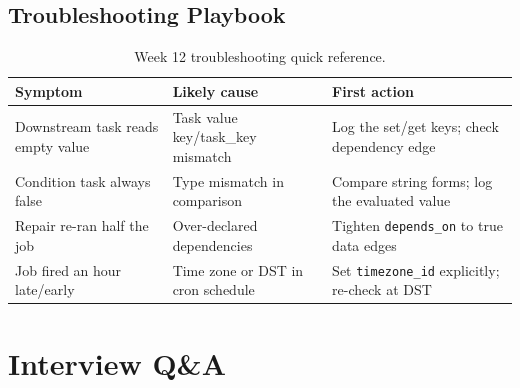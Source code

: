\subsection{Troubleshooting Playbook}
\begin{table}[H]
\centering
\small
\begin{tabular}{@{}p{3.6cm}p{4.2cm}p{4.8cm}@{}}
\toprule
\textbf{Symptom} & \textbf{Likely cause} & \textbf{First action} \\
\midrule
Downstream task reads empty value & Task value key/task\_key mismatch & Log the set/get keys; check dependency edge \\
Condition task always false & Type mismatch in comparison & Compare string forms; log the evaluated value \\
Repair re-ran half the job & Over-declared dependencies & Tighten \texttt{depends\_on} to true data edges \\
Job fired an hour late/early & Time zone or DST in cron schedule & Set \texttt{timezone\_id} explicitly; re-check at DST \\
\bottomrule
\end{tabular}
\caption{Week 12 troubleshooting quick reference.}
\label{tab:ch12-trouble}
\end{table}

\section{Interview Q\&A}
